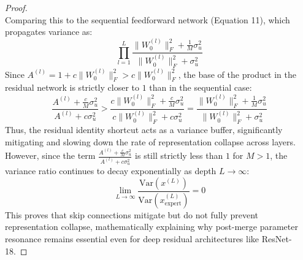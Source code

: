 \documentclass{article}
\theoremstyle{plain}
\theoremstyle{definition}
\theoremstyle{remark}
\begin{document}
\begin{proof}
\begin{equation}
\end{equation}
Comparing this to the sequential feedforward network (Equation 11), which propagates variance as:
\begin{equation}
    \prod_{l=1}^L \frac{\|W_0^{(l)}\|_F^2 + \frac{1}{M}\sigma_u^2}{\|W_0^{(l)}\|_F^2 + \sigma_u^2}
\end{equation}
Since $A^{(l)} = 1 + c \|W_0^{(l)}\|_F^2 > c \|W_0^{(l)}\|_F^2$, the base of the product in the residual network is strictly closer to $1$ than in the sequential case:
\begin{equation}
    \frac{A^{(l)} + \frac{c}{M}\sigma_u^2}{A^{(l)} + c \sigma_u^2} > \frac{c \|W_0^{(l)}\|_F^2 + \frac{c}{M}\sigma_u^2}{c \|W_0^{(l)}\|_F^2 + c \sigma_u^2} = \frac{\|W_0^{(l)}\|_F^2 + \frac{1}{M}\sigma_u^2}{\|W_0^{(l)}\|_F^2 + \sigma_u^2}
\end{equation}
Thus, the residual identity shortcut acts as a variance buffer, significantly mitigating and slowing down the rate of representation collapse across layers. However, since the term $\frac{A^{(l)} + \frac{c}{M}\sigma_u^2}{A^{(l)} + c \sigma_u^2}$ is still strictly less than $1$ for $M > 1$, the variance ratio continues to decay exponentially as depth $L \to \infty$:
\begin{equation}
    \lim_{L \to \infty} \frac{\text{Var}(x^{(L)})}{\text{Var}(x_{\text{expert}}^{(L)})} = 0
\end{equation}
This proves that skip connections mitigate but do not fully prevent representation collapse, mathematically explaining why post-merge parameter resonance remains essential even for deep residual architectures like ResNet-18.
\end{proof}
\end{document}
